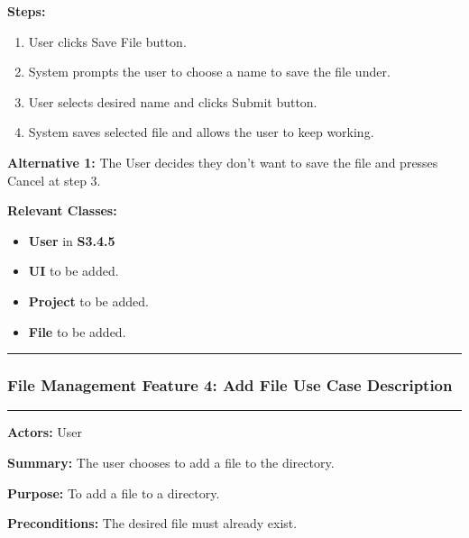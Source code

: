 \documentclass[twoside,letterpaper]{article}
\begin{document}
	\noindent\textbf{Steps:} \begin{enumerate}
		\item User clicks Save File button.
		\item System prompts the user to choose a name to save the file under.
		\item User selects desired name and clicks Submit button.
		\item System saves selected file and allows the user to keep working.
	
	\end{enumerate}
	\noindent\textbf{Alternative 1:} The User decides they don't want to save the file and presses Cancel at step 3. \newline
	
	\noindent\textbf{Relevant Classes:}
	\begin{itemize}
		\item \textbf{User} in \textbf{S3.4.5}
		\item \textbf{UI} to be added.
		\item \textbf{Project} to be added.
		\item \textbf{File} to be added.
	\end{itemize}
	\vspace{8pt}
	\hrule
	
	\newpage
	
	\subsubsection[File Management Feature 4: Add File Use Case Description]{\rmfamily\bfseries\color{black}
		File Management Feature 4: Add File Use Case Description}
	\hypertarget{RefHeading22059017292}{}
	
	\vspace{2pt}
	\hrule
	\vspace{8pt}
	\textbf{Actors:} User \newline
	
	\noindent\textbf{Summary:} The user chooses to add a file to the directory. \newline
	
	\noindent\textbf{Purpose:} To add a file to a directory. \newline
	
	\noindent\textbf{Preconditions:} The desired file must already exist. \newline
	
\end{document}
